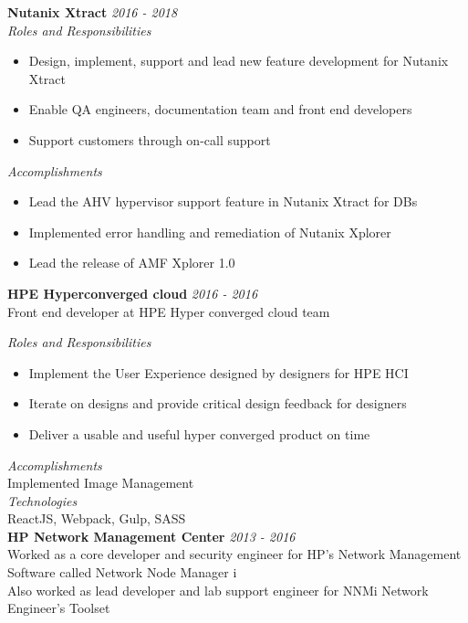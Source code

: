 \documentclass[line,margin]{res}
\begin{document}
\begin{resume}
{\bf Nutanix Xtract} \hfill {\it{2016 - 2018}}\\

{\it{Roles and Responsibilities}}\\
\begin{itemize}
\item Design, implement, support and lead new feature development for Nutanix Xtract
\item Enable QA engineers, documentation team and front end developers
\item Support customers through on-call support
\end{itemize}

{\it{Accomplishments}}\\
\begin{itemize}
\item Lead the AHV hypervisor support feature in Nutanix Xtract for DBs
\item Implemented error handling and remediation of Nutanix Xplorer
\item Lead the release of AMF Xplorer 1.0
\end{itemize}


{\bf HPE Hyperconverged cloud} \hfill {\it{2016 - 2016}}\\
Front end developer at HPE Hyper converged cloud team

{\it{Roles and Responsibilities}}\\
\begin{itemize}
\item Implement the User Experience designed by designers for HPE HCI
\item Iterate on designs and provide critical design feedback for designers
\item Deliver a usable and useful hyper converged product on time
\end{itemize}

{\it{Accomplishments}}\\
Implemented Image Management\\

{\it{Technologies}}\\
ReactJS, Webpack, Gulp, SASS\\


{\bf HP Network Management Center} \hfill {\it{2013 - 2016}}\\
Worked as a core developer and security engineer for HP's Network Management Software called Network Node Manager i\\
Also worked as lead developer and lab support engineer for NNMi Network Engineer's Toolset\\


\end{resume}
\end{document}
